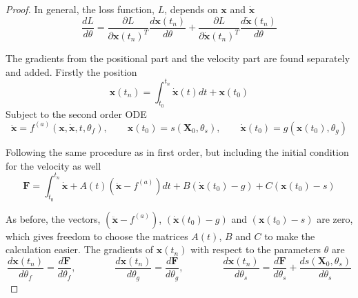 \documentclass{article}
\theoremstyle{remark}
\theoremstyle{definition}
\begin{document}
\begin{proof}
In general, the loss function, $L$, depends on $\mathbf{x}$ and $\dot{\mathbf{x}}$
\begin{equation}
\label{eqn: dLdthet_second_order_1}
    \frac{dL}{d\theta} = \frac{\partial L}{\partial \mathbf{x}(t_{n})^{T}}
    \frac{d\mathbf{x}(t_{n})}{d\theta}
    + \frac{\partial L}{\partial \dot{\mathbf{x}}(t_{n})^{T}}\frac{d\dot{\mathbf{x}}(t_{n})}{d\theta}
\end{equation}

The gradients from the positional part and the velocity part are found separately and added. Firstly the position
\begin{equation}
    \mathbf{x}(t_{n}) = \int_{t_{0}}^{t_{n}}\dot{\mathbf{x}}(t) dt + \mathbf{x}(t_{0})
\end{equation}
Subject to the second order ODE
\begin{equation}
    \ddot{\mathbf{x}} = f^{(a)}(\mathbf{x}, \dot{\mathbf{x}}, t, \theta_{f})
    ,\qquad
    \mathbf{x}(t_{0}) = s(\mathbf{X}_{0}, \theta_{s})
    ,\qquad
    \dot{\mathbf{x}}(t_{0}) = g(\mathbf{x}(t_{0}), \theta_{g})
\end{equation}

Following the same procedure as in first order, but including the initial condition for the velocity as well
\begin{equation}
\label{eqn: F_second_order}
    \mathbf{F} = \int_{t_{0}}^{t_{n}}\dot{\mathbf{x}} + A(t)(\ddot{\mathbf{x}} - f^{(a)})dt
    +B(\dot{\mathbf{x}}(t_{0}) - g) + C(\mathbf{x}(t_{0}) - s)
\end{equation}

As before, the vectors, $(\ddot{\mathbf{x}} - f^{(a)})$, $(\dot{\mathbf{x}}(t_{0}) - g)$ and $(\mathbf{x}(t_{0}) - s)$ are zero, which gives freedom to choose the matrices $A(t)$, $B$ and $C$ to make the calculation easier. The gradients of $\mathbf{x}(t_{n})$ with respect to the parameters $\theta$ are
\begin{equation}
\label{eqn: dxdtheta_second__order_1}
    \frac{d\mathbf{x}(t_{n})}{d\theta_{f}} = \frac{d\mathbf{F}}{d\theta_{f}},
    \qquad\qquad
    \frac{d\mathbf{x}(t_{n})}{d\theta_{g}} = \frac{d\mathbf{F}}{d\theta_{g}},
    \qquad\qquad
    \frac{d\mathbf{x}(t_{n})}{d\theta_{s}} = \frac{d\mathbf{F}}{d\theta_{s}} + \frac{ds(\mathbf{X}_{0}, \theta_{s})}{d\theta_{s}}
\end{equation}


\end{proof}
\end{document}
